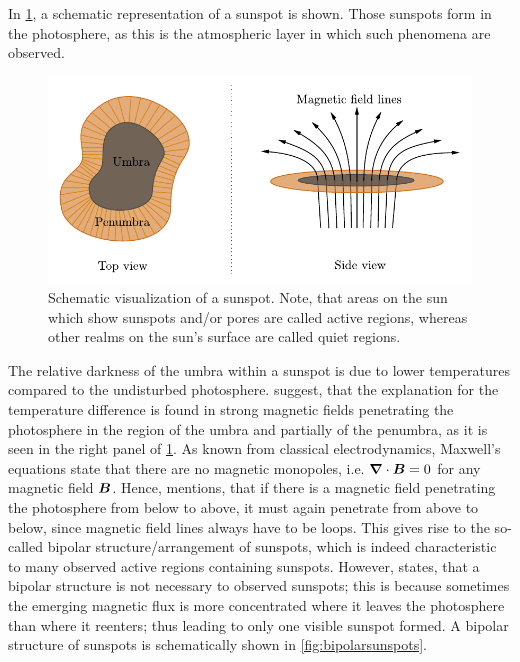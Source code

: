 \documentclass[a4paper,12pt]{report}
\begin{document}
In \cref{fig:sunspotsschematic}, a schematic representation of a sunspot is shown. Those sunspots form in the photosphere, as this is the atmospheric layer in which such phenomena are observed.
\begin{figure}[h]
\centering
\includegraphics[width=\textwidth-2cm]{figures/sunspotsschematic.pdf}
\caption{Schematic visualization of a sunspot. Note, that areas on the sun which show sunspots and/or pores are called active regions, whereas other realms on the sun's surface are called quiet regions.}
\label{fig:sunspotsschematic}
\end{figure}
The relative darkness of the umbra within a sunspot is due to lower temperatures compared to the undisturbed photosphere. \cite[p.142]{Weigert.2006} suggest, that the explanation for the temperature difference is found in strong magnetic fields penetrating the photosphere in the region of the umbra and partially of the penumbra, as it is seen in the right panel of \cref{fig:sunspotsschematic}. As known from classical electrodynamics, Maxwell's equations state that there are no magnetic monopoles, i.e. $\bm{\nabla}\cdot \bm{B} = 0$ for any magnetic field $\bm{B}$. Hence, \cite[p.342]{Stix.2002} mentions, that if there is a magnetic field penetrating the photosphere from below to above, it must again penetrate from above to below, since magnetic field lines always have to be loops. This gives rise to the so-called bipolar structure/arrangement of sunspots, which is indeed characteristic to many observed active regions containing sunspots. However, \cite[p.342]{Stix.2002} states, that a bipolar structure is not necessary to observed sunspots; this is because sometimes the emerging magnetic flux is more concentrated where it leaves the photosphere than where it reenters; thus leading to only one visible sunspot formed. A bipolar structure of sunspots is schematically shown in \cref{fig:bipolarsunspots}.
\end{document}

